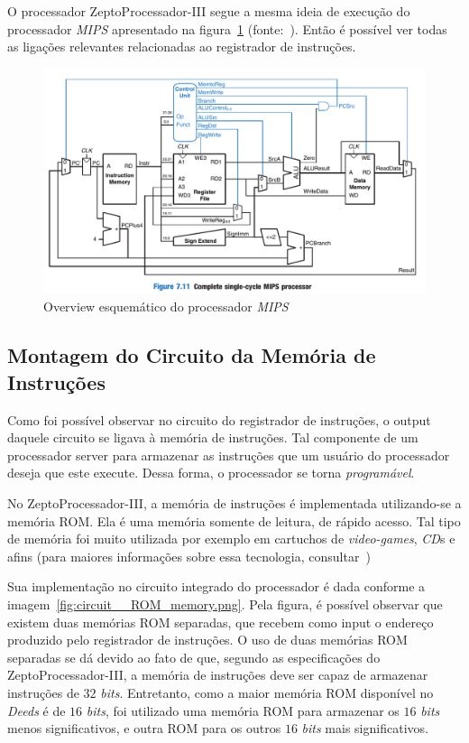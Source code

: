 \documentclass[12pt]{article}
\begin{document}
O processador ZeptoProcessador-III segue a mesma ideia de execução do
processador \emph{MIPS} apresentado na figura~\ref{fig:circuit__MIPS.png}
(fonte:~\cite{Digital_Design}). Então é possível ver todas as ligações
relevantes relacionadas ao registrador de instruções.

\begin{figure}[H]
    \centering
    \includegraphics[width=.9\textwidth]{Projeto/images/circuit__MIPS.png}
    \caption{Overview esquemático do processador \emph{MIPS}}\label{fig:circuit__MIPS.png}
\end{figure}

\subsection{Montagem do Circuito da Memória de Instruções}\label{sec:2.2}

Como foi possível observar no circuito do registrador de instruções, o output
daquele circuito se ligava à memória de instruções. Tal componente de um
processador server para armazenar as instruções que um usuário do processador
deseja que este execute. Dessa forma, o processador se torna \emph{programável}.

No ZeptoProcessador-III, a memória de instruções é implementada utilizando-se a
memória ROM. Ela é uma memória somente de leitura, de rápido acesso. Tal tipo de
memória foi muito utilizada por exemplo em cartuchos de \emph{video-games},
\emph{CD}s e afins (para maiores informações sobre essa tecnologia,
consultar~\cite{ROM_memory})

Sua implementação no circuito integrado do processador é dada conforme a
imagem~\ref{fig:circuit__ROM_memory.png}. Pela figura, é possível observar que
existem duas memórias ROM separadas, que recebem como input o endereço produzido
pelo registrador de instruções. O uso de duas memórias ROM separadas se dá
devido ao fato de que, segundo as especificações do ZeptoProcessador-III, a
memória de instruções deve ser capaz de armazenar instruções de $32$
\emph{bits}. Entretanto, como a maior memória ROM disponível no \emph{Deeds} é
de $16$ \emph{bits}, foi utilizado uma memória ROM para armazenar os $16$
\emph{bits} menos significativos, e outra ROM para os outros $16$ \emph{bits}
mais significativos.
\end{document}
